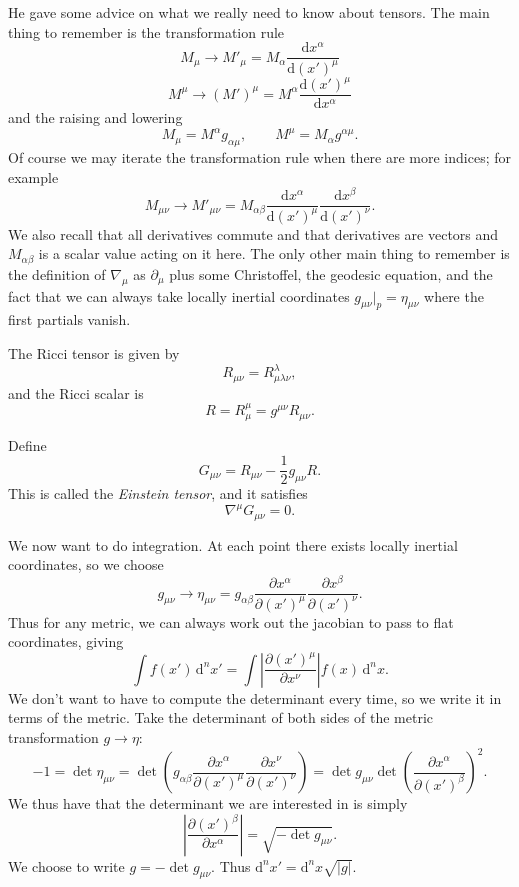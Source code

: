 
He gave some advice on what we really need to know about tensors. The main thing to remember is the transformation rule
\[
	M_\mu \to M'_\mu =M_\alpha \frac{\mathrm{d}x^\alpha }{\mathrm{d}(x')^\mu } 
\]
\[
	M^\mu \to (M')^\mu =M^\alpha \frac{\mathrm{d}(x')^\mu }{\mathrm{d}x^\alpha } 
\]
and the raising and lowering
\[
	M_\mu =M^\alpha g_{\alpha \mu } ,\qquad M^\mu =M_\alpha g^{\alpha \mu } 
.\]
Of course we may iterate the transformation rule when there are more indices; for example
\[
	M_{\mu \nu } \to M'_{\mu \nu } =M_{\alpha \beta } \frac{\mathrm{d}x^\alpha }{\mathrm{d}(x')^\mu } \frac{\mathrm{d}x^\beta }{\mathrm{d}(x')^\nu } 
.\]
We also recall that all derivatives commute and that derivatives are vectors and $M_{\alpha \beta } $ is a scalar value acting on it here. The only other main thing to remember is the definition of $\nabla_\mu $ as $\partial _\mu $ plus some Christoffel, the geodesic equation, and the fact that we can always take locally inertial coordinates $g_{\mu \nu } |_p=\eta _{\mu \nu } $ where the first partials vanish.

The Ricci tensor is given by
\[
	R_{\mu \nu } =R^{\lambda } _{\mu \lambda \nu } 
,\]
and the Ricci scalar is
\[
	R=R^\mu _\mu =g^{\mu \nu } R_{\mu \nu } 
.\]

Define
\[
	G_{\mu \nu } =R_{\mu \nu } -\frac{1}{2} g_{\mu \nu } R
.\]
This is called the \emph{Einstein tensor}, and it satisfies
\[
	\nabla ^\mu G_{\mu \nu } =0
.\]

We now want to do integration. At each point there exists locally inertial coordinates, so we choose
\[
	g_{\mu \nu } \to \eta _{\mu \nu } =g_{\alpha \beta } \frac{\partial x^\alpha }{\partial (x')^\mu } \frac{\partial x^\beta }{\partial (x')^\nu } 
.\]
Thus for any metric, we can always work out the jacobian to pass to flat coordinates, giving
\[
	\int f(x') \,\mathrm{d} ^nx'=\int \left| \frac{\partial (x')^\mu }{\partial x^\nu }  \right| f(x) \,\mathrm{d} ^nx
.\]
We don't want to have to compute the determinant every time, so we write it in terms of the metric. Take the determinant of both sides of the metric transformation $g\to \eta $:
\[
	-1=\det \eta _{\mu \nu } =\det \left( g_{\alpha \beta } \frac{\partial x^\alpha }{\partial (x')^\mu } \frac{\partial x^\nu }{\partial (x')^\nu }  \right)=\det g_{\mu \nu } \det \left( \frac{\partial x^\alpha }{\partial (x')^\beta }  \right) ^2
.\]
We thus have that the determinant we are interested in is simply
\[
	\left| \frac{\partial (x')^\beta }{\partial x^\alpha }  \right| =\sqrt{-\det g_{\mu \nu } } 
.\]
We choose to write $g=-\det g_{\mu \nu } $. Thus $\mathrm{d} ^nx'=\mathrm{d} ^nx \sqrt{\left| g \right| } $.


